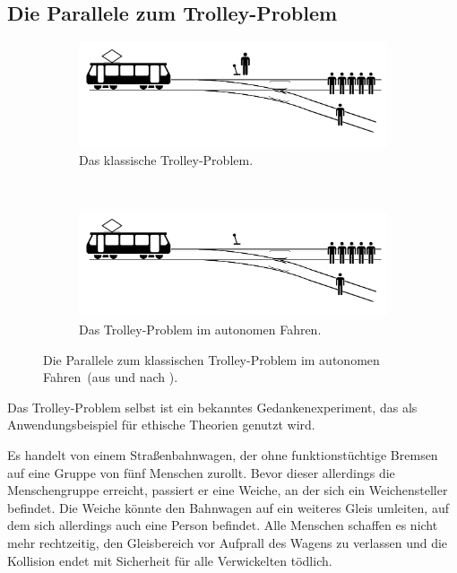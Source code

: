 \documentclass[twocolumn, german]{tum-article}
\begin{document}
\subsection{Die Parallele zum Trolley-Problem}
\begin{figure}
	\centering
	\begin{subfigure}[t]{0.35\paperwidth}
		\centering
		\includegraphics[width=\textwidth]{media/trolley-img-with}
		\caption{Das klassische Trolley-Problem.}
	\end{subfigure}
	~
	\begin{subfigure}[t]{0.35\paperwidth}
		\centering
		\includegraphics[width=\textwidth]{media/trolley-img-without}
		\caption{Das Trolley-Problem im autonomen Fahren.}
	\end{subfigure}
	\caption{Die Parallele zum klassischen Trolley-Problem im autonomen Fahren~(aus und nach \cite{trolley-img-clean}).}
	\label{fig:trolley-autonomous}
\end{figure}

Das Trolley-Problem selbst ist ein bekanntes Gedankenexperiment, das als Anwendungsbeispiel für ethische Theorien genutzt wird.

Es handelt von einem Straßenbahnwagen, der ohne funktionstüchtige Bremsen auf eine Gruppe von fünf Menschen zurollt.
Bevor dieser allerdings die Menschengruppe erreicht, passiert er eine Weiche, an der sich ein Weichensteller befindet.
Die Weiche könnte den Bahnwagen auf ein weiteres Gleis umleiten, auf dem sich allerdings auch eine Person befindet.
Alle Menschen schaffen es nicht mehr rechtzeitig, den Gleisbereich vor Aufprall des Wagens zu verlassen und die Kollision endet mit Sicherheit für alle Verwickelten tödlich.
\end{document}
